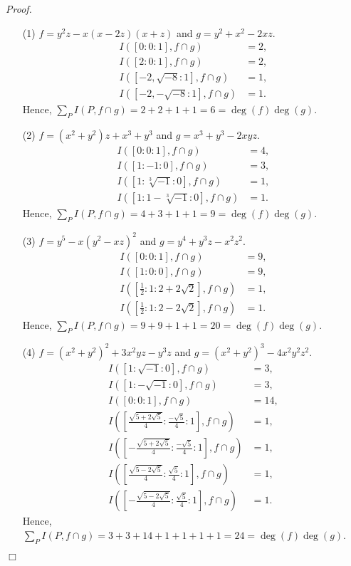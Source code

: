 \documentclass{article}
\begin{document}
\emph{Proof.}
\begin{enumerate}
\item[(1)]
  $f = y^2z - x(x-2z)(x+z)$ and $g = y^2 + x^2 - 2xz$.
  \begin{align*}
    I([0:0:1], f \cap g) &= 2, \\
    I([2:0:1], f \cap g) &= 2, \\
    I([-2,\sqrt{-8}:1], f \cap g) &= 1, \\
    I([-2,-\sqrt{-8}:1], f \cap g) &= 1.
  \end{align*}
  Hence, $\sum_P I(P, f \cap g) = 2 + 2 + 1 + 1 = 6 = \deg(f) \deg(g)$.

\item[(2)]
  $f = (x^2+y^2)z + x^3 + y^3$ and $g = x^3 + y^3 - 2xyz$.
  \begin{align*}
    I([0:0:1], f \cap g) &= 4, \\
    I([1:-1:0], f \cap g) &= 3, \\
    I([1:\sqrt[3]{-1}:0], f \cap g) &= 1, \\
    I([1:1-\sqrt[3]{-1}:0], f \cap g) &= 1.
  \end{align*}
  Hence, $\sum_P I(P, f \cap g) = 4 + 3 + 1 + 1 = 9 = \deg(f) \deg(g)$.

\item[(3)]
  $f = y^5 - x(y^2-xz)^2$ and $g = y^4 + y^3z - x^2z^2$.
  \begin{align*}
    I([0:0:1], f \cap g) &= 9, \\
    I([1:0:0], f \cap g) &= 9, \\
    I\left(\left[ \frac{1}{2}:1:2+2\sqrt{2} \right], f \cap g\right) &= 1, \\
    I\left(\left[ \frac{1}{2}:1:2-2\sqrt{2} \right], f \cap g\right) &= 1.
  \end{align*}
  Hence, $\sum_P I(P, f \cap g) = 9 + 9 + 1 + 1 = 20 = \deg(f) \deg(g)$.

\item[(4)]
  $f = (x^2+y^2)^2 + 3x^2yz - y^3z$ and $g = (x^2+y^2)^3 - 4x^2y^2z^2$.
  \begin{align*}
    I([1:\sqrt{-1}:0], f \cap g) &= 3, \\
    I([1:-\sqrt{-1}:0], f \cap g) &= 3, \\
    I([0:0:1], f \cap g) &= 14, \\
    I\left(\left[ \frac{\sqrt{5+2\sqrt{5}}}{4} : \frac{-\sqrt{5}}{4} : 1 \right],
      f \cap g\right) &= 1, \\
    I\left(\left[ -\frac{\sqrt{5+2\sqrt{5}}}{4} : \frac{-\sqrt{5}}{4} : 1 \right],
      f \cap g\right) &= 1, \\
    I\left(\left[ \frac{\sqrt{5-2\sqrt{5}}}{4} : \frac{\sqrt{5}}{4} : 1 \right],
      f \cap g\right) &= 1, \\
    I\left(\left[ -\frac{\sqrt{5-2\sqrt{5}}}{4} : \frac{\sqrt{5}}{4} : 1 \right],
      f \cap g\right) &= 1.
  \end{align*}
  Hence, $\sum_P I(P, f \cap g) = 3 + 3 + 14 + 1 + 1 + 1 + 1 = 24 = \deg(f) \deg(g)$.
\end{enumerate}
$\Box$ \\\\
\end{document}
